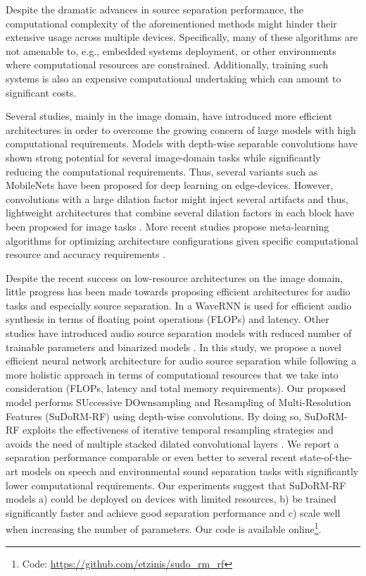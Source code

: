 \documentclass{article}
\theoremstyle{definition}
\newcommand{\sudo}{SuDoRM-RF }
\newcommand{\sudodot}{SuDoRM-RF}
\begin{document}
Despite the dramatic advances in source separation performance, the computational complexity of the aforementioned methods might hinder their extensive usage across multiple devices. Specifically, many of these algorithms are not amenable to, e.g., embedded systems deployment, or other environments where computational resources are constrained.  Additionally, training such systems is also an expensive computational undertaking which can amount to significant costs.

Several studies, mainly in the image domain, have introduced more efficient architectures in order to overcome the growing concern of large models with high computational requirements. Models with depth-wise separable convolutions \cite{sifre2014depthwiseseparable} have shown strong potential for several image-domain tasks \cite{chollet2017xception_depthwiseseparable} while significantly reducing the computational requirements. Thus, several variants such as MobileNets \cite{howard2017mobilenets} have been proposed for deep learning on edge-devices. However, convolutions with a large dilation factor might inject several artifacts and thus, lightweight architectures that combine several dilation factors in each block have been proposed for image tasks \cite{mehta2019espnetv2}. More recent studies propose meta-learning algorithms for optimizing architecture configurations given specific computational resource and accuracy requirements \cite{yu2019slimmablenets, cai2019onceandforall}.

Despite the recent success on low-resource architectures on the image domain, little progress has been made towards proposing efficient architectures for audio tasks and especially source separation. In \cite{kalchbrenner2018efficient_audiosynthesis} a WaveRNN is used for efficient audio synthesis in terms of floating point operations (FLOPs) and latency. Other studies have introduced audio source separation models with reduced number of trainable parameters \cite{luo2019dual, maldonado2020lightweight} and binarized models \cite{kim2018bitwise}. In this study, we propose a novel efficient neural network architecture for audio source separation while following a more holistic approach in terms of computational resources that we take into consideration (FLOPs, latency and total memory requirements). Our proposed model performs SUccessive DOwnsampling and Resampling of Multi-Resolution Features (\sudodot) using depth-wise convolutions. By doing so, \sudo exploits the effectiveness of iterative temporal resampling strategies \cite{haris2018deepbackprojectionSuperResolution} and avoids the need of multiple stacked dilated convolutional layers \cite{luo2019convTasNet}. We report a separation performance comparable or even better to several recent state-of-the-art models on speech and environmental sound separation tasks with significantly lower computational requirements. Our experiments suggest that \sudo models a) could be deployed on devices with limited resources, b) be trained significantly faster and achieve good separation performance and c) scale well when increasing the number of parameters. Our code is available online\footnote{Code: \href{https://github.com/etzinis/sudo\_rm\_rf}{https://github.com/etzinis/sudo\_rm\_rf}}.
\end{document}
